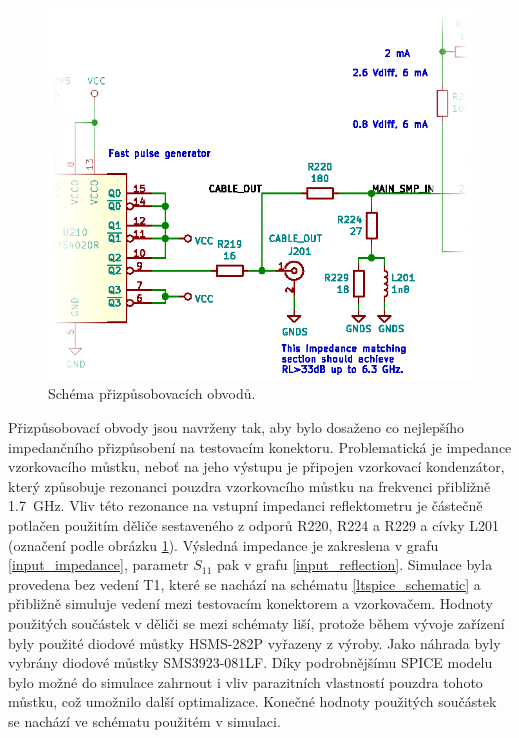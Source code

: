 \begin{figure}[htbp]
\includegraphics[width=\textwidth,keepaspectratio]{images/match_section.eps}\caption{Schéma přizpůsobovacích obvodů.}\label{match_section_schematic}
\end{figure}

Přizpůsobovací obvody jsou navrženy tak, aby bylo dosaženo co nejlepšího impedančního přizpůsobení na testovacím konektoru. Problematická je impedance vzorkovacího můstku, neboť na jeho výstupu je připojen vzorkovací kondenzátor, který způsobuje rezonanci pouzdra vzorkovacího můstku na frekvenci přibližně \SI{1.7}{\giga\hertz}. Vliv této rezonance na vstupní impedanci reflektometru je částečně potlačen použitím děliče sestaveného z odporů R220, R224 a R229 a cívky L201 (označení podle obrázku \ref{match_section_schematic}). Výsledná impedance je zakreslena v grafu \ref{input_impedance}, parametr $S_{11}$ pak v grafu \ref{input_reflection}. Simulace byla provedena bez vedení T1, které se nachází na schématu \ref{ltspice_schematic} a přibližně simuluje vedení mezi testovacím konektorem a vzorkovačem. Hodnoty použitých součástek v děliči se mezi schématy liší, protože během vývoje zařízení byly použité diodové můstky HSMS-282P vyřazeny z výroby. Jako náhrada byly vybrány diodové můstky SMS3923-081LF. Díky podrobnějšímu SPICE modelu bylo možné do simulace zahrnout i vliv parazitních vlastností pouzdra tohoto můstku, což umožnilo další optimalizace. Konečné hodnoty použitých součástek se nachází ve schématu použitém v simulaci.

